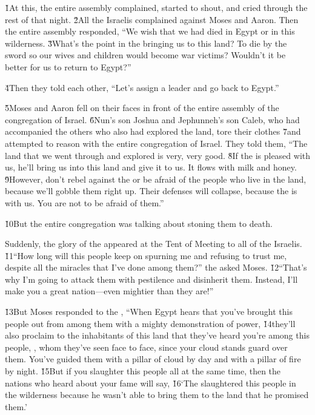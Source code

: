 \v{1}At this, the entire assembly complained, started to shout, and cried through the rest of that night. \v{2}All the Israelis complained against Moses and Aaron. Then the entire assembly responded, ``We wish that we had died in Egypt or in this wilderness. \v{3}What's the point in the  bringing us to this land? To die by the sword so our wives and children would become war victims? Wouldn't it be better for us to return to Egypt?''

\v{4}Then they told each other, ``Let's assign a leader and go back to Egypt.''

\v{5}Moses and Aaron fell on their faces in front of the entire assembly of the congregation of Israel. \v{6}Nun's son Joshua and Jephunneh's son Caleb, who had accompanied the others who also had explored the land, tore their clothes \v{7}and attempted to reason with the entire congregation of Israel. They told them, ``The land that we went through and explored is very, very good. \v{8}If the  is pleased with us, he'll bring us into this land and give it to us. It flows with milk and honey. \v{9}However, don't rebel against the  or be afraid of the people who live in the land, because we'll gobble them right up. Their defenses will collapse, because the  is with us. You are not to be afraid of them.''

\v{10}But the entire congregation was talking about stoning them to death.

Suddenly, the glory of the  appeared at the Tent of Meeting to all of the Israelis. \v{11}``How long will this people keep on spurning me and refusing to trust me, despite all the miracles that I've done among them?'' the  asked Moses. \v{12}``That's why I'm going to attack them with pestilence and disinherit them. Instead, I'll make you a great nation---even mightier than they are!''

\v{13}But Moses responded to the , ``When Egypt hears that you've brought this people out from among them with a mighty demonstration of power, \v{14}they'll also proclaim to the inhabitants of this land that they've heard you're among this people, , whom they've seen face to face, since your cloud stands guard over them. You've guided them with a pillar of cloud by day and with a pillar of fire by night. \v{15}But if you slaughter this people all at the same time, then the nations who heard about your fame will say, \v{16}`The  slaughtered this people in the wilderness because he wasn't able to bring them to the land that he promised them.'

